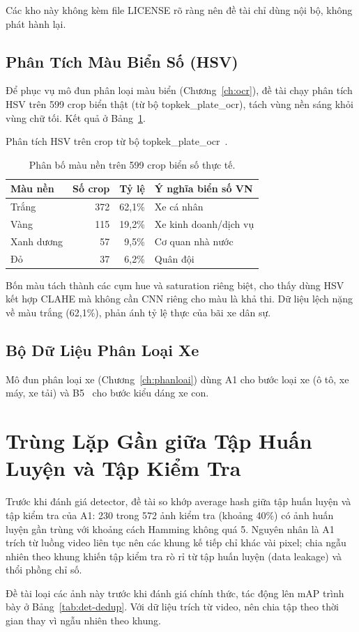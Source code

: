 Các kho này không kèm file LICENSE rõ ràng nên đề tài chỉ dùng nội bộ, không phát hành
lại.

\subsection{Phân Tích Màu Biển Số (HSV)}
\label{sec:hsv}

Để phục vụ mô đun phân loại màu biển (Chương~\ref{ch:ocr}), đề tài chạy phân tích HSV trên
599 crop biển thật (từ bộ topkek\_plate\_ocr), tách vùng nền sáng khỏi vùng chữ tối.
Kết quả ở Bảng~\ref{tab:hsv-color}.

\begin{table}[htbp]
\centering
\caption{Phân bố màu nền trên 599 crop biển số thực tế.}

{\footnotesize Phân tích HSV trên crop từ bộ topkek\_plate\_ocr~\autocite{topkek2024vnplateocr}.}
\label{tab:hsv-color}
\begin{tabular}{lrrp{4.5cm}}
\toprule
\textbf{Màu nền} & \textbf{Số crop} & \textbf{Tỷ lệ} & \textbf{Ý nghĩa biển số VN} \\
\midrule
Trắng & 372 & 62,1\% & Xe cá nhân \\
Vàng & 115 & 19,2\% & Xe kinh doanh/dịch vụ \\
Xanh dương & 57 & 9,5\% & Cơ quan nhà nước \\
Đỏ & 37 & 6,2\% & Quân đội \\
\bottomrule
\end{tabular}
\end{table}

Bốn màu tách thành các cụm hue và saturation riêng biệt, cho thấy dùng HSV kết hợp CLAHE
mà không cần CNN riêng cho màu là khả thi. Dữ liệu lệch nặng về màu trắng (62,1\%), phản
ánh tỷ lệ thực của bãi xe dân sự.

\subsection{Bộ Dữ Liệu Phân Loại Xe}

Mô đun phân loại xe (Chương~\ref{ch:phanloai}) dùng A1 cho bước loại xe (ô tô, xe máy, xe
tải) và B5~\autocite{researchprojects2022vehiclebodystyle} cho bước kiểu dáng xe con.

\section{Trùng Lặp Gần giữa Tập Huấn Luyện và Tập Kiểm Tra}
\label{sec:dedup}

Trước khi đánh giá detector, đề tài so khớp average hash giữa tập huấn luyện và tập kiểm tra
của A1: 230 trong 572 ảnh kiểm tra (khoảng 40\%) có ảnh huấn luyện gần trùng với khoảng cách
Hamming không quá 5. Nguyên nhân là A1 trích từ luồng video liên tục nên các khung kế tiếp
chỉ khác vài pixel; chia ngẫu nhiên theo khung khiến tập kiểm tra rò rỉ từ tập huấn luyện
(data leakage) và thổi phồng chỉ số.

Đề tài loại các ảnh này trước khi đánh giá chính thức, tác động lên mAP trình bày ở
Bảng~\ref{tab:det-dedup}. Với dữ liệu trích từ video, nên chia tập theo thời gian thay vì
ngẫu nhiên theo khung.
